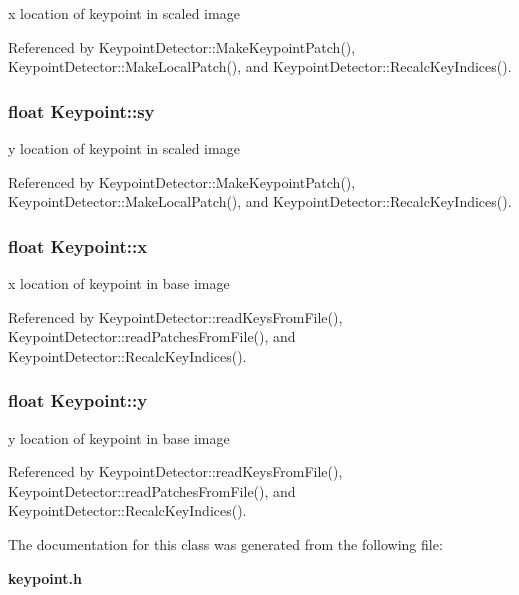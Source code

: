 x location of keypoint in scaled image 



Referenced by Keypoint\+Detector\+::\+Make\+Keypoint\+Patch(), Keypoint\+Detector\+::\+Make\+Local\+Patch(), and Keypoint\+Detector\+::\+Recalc\+Key\+Indices().

\subsubsection[{sy}]{\setlength{\rightskip}{0pt plus 5cm}float Keypoint\+::sy}\label{classKeypoint_abdbd7c7242d3fbca86979940cfde905e}


y location of keypoint in scaled image 



Referenced by Keypoint\+Detector\+::\+Make\+Keypoint\+Patch(), Keypoint\+Detector\+::\+Make\+Local\+Patch(), and Keypoint\+Detector\+::\+Recalc\+Key\+Indices().

\subsubsection[{x}]{\setlength{\rightskip}{0pt plus 5cm}float Keypoint\+::x}\label{classKeypoint_a750bdbcf6567b42842970f67774f3d19}


x location of keypoint in base image 



Referenced by Keypoint\+Detector\+::read\+Keys\+From\+File(), Keypoint\+Detector\+::read\+Patches\+From\+File(), and Keypoint\+Detector\+::\+Recalc\+Key\+Indices().

\subsubsection[{y}]{\setlength{\rightskip}{0pt plus 5cm}float Keypoint\+::y}\label{classKeypoint_a4ace6080aa73a9aeda4436bf6feb367b}


y location of keypoint in base image 



Referenced by Keypoint\+Detector\+::read\+Keys\+From\+File(), Keypoint\+Detector\+::read\+Patches\+From\+File(), and Keypoint\+Detector\+::\+Recalc\+Key\+Indices().



The documentation for this class was generated from the following file\+:\begin{DoxyCompactItemize}
\item 
{\bf keypoint.\+h}\end{DoxyCompactItemize}
